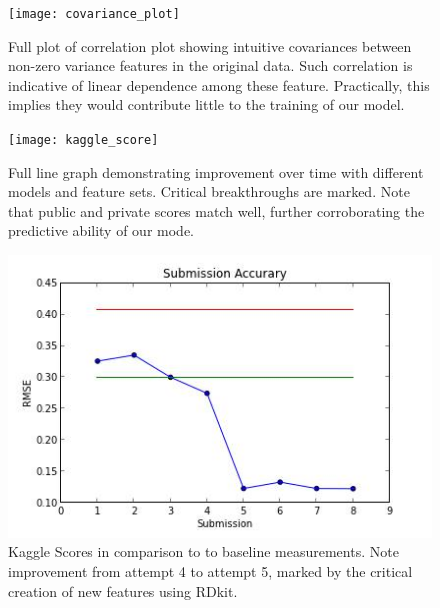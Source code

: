 \documentclass[letterpaper]{article}
\begin{document}
\begin{center}
\begin{figure}[h!]
\texttt{[image: covariance\_plot]}
\caption{Full plot of correlation plot showing intuitive covariances between non-zero variance features in the original data. Such correlation is indicative of linear dependence among these feature. Practically, this implies they would contribute little to the training of our model.}
\label{fig:correlation_plot_full}
\end{figure}

\begin{figure}[h!]
\texttt{[image: kaggle\_score]}
\caption{Full line graph demonstrating improvement over time with different models and feature sets. Critical breakthroughs are marked. Note that public and private scores match well, further corroborating the predictive ability of our mode.}
\label{fig:kaggle_score_full}
\end{figure}


\begin{figure}[h!]
\includegraphics{accuracy_results}
\caption{Kaggle Scores in comparison to to baseline measurements. Note improvement from attempt 4 to attempt 5, marked by the critical creation of new features using RDkit.}
\label{fig:kaggle_score_two_full}
\end{figure}

\end{center}
\end{document}
